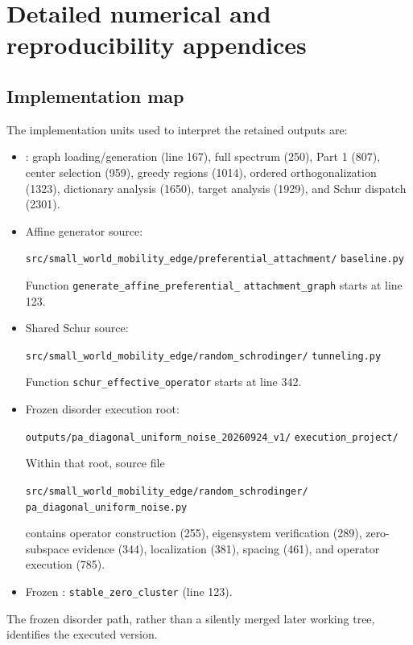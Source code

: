 \documentclass[11pt]{article}
\newcommand{\code}[1]{\texttt{#1}}
\begin{document}
\section{Detailed numerical and reproducibility appendices}

\subsection{Implementation map}

The implementation units used to interpret the retained outputs are:
\begin{itemize}
\item {}: graph loading/generation (line 167), full spectrum (250), Part 1 (807), center selection (959), greedy regions (1014), ordered orthogonalization (1323), dictionary analysis (1650), target analysis (1929), and Schur dispatch (2301).
\item Affine generator source:\par
\small\texttt{src/small\_world\_mobility\_edge/preferential\_attachment/}\newline
\texttt{baseline.py}\normalsize\par
Function \texttt{generate\_affine\_preferential\_}\newline
\texttt{attachment\_graph} starts at line 123.
\item Shared Schur source:\par
\small\texttt{src/small\_world\_mobility\_edge/random\_schrodinger/}\newline
\texttt{tunneling.py}\normalsize\par
Function \texttt{schur\_effective\_operator} starts at line 342.
\item Frozen disorder execution root:\par
\small\texttt{outputs/pa\_diagonal\_uniform\_noise\_20260924\_v1/}\newline
\texttt{execution\_project/}\normalsize\par
Within that root, source file\par
\small\texttt{src/small\_world\_mobility\_edge/random\_schrodinger/}\newline
\texttt{pa\_diagonal\_uniform\_noise.py}\normalsize\par
contains operator construction (255), eigensystem verification (289), zero-subspace evidence (344), localization (381), spacing (461), and operator execution (785).
\item Frozen : \code{stable\_zero\_cluster} (line 123).
\end{itemize}
The frozen disorder path, rather than a silently merged later working tree, identifies the executed version.
\end{document}
